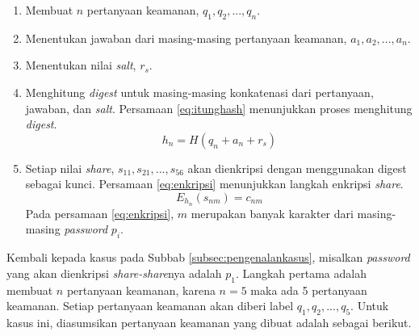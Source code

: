 \begin{enumerate}
	\item Membuat \begin{math}n\end{math} pertanyaan keamanan, \begin{math}q_1, q_2, ..., q_n\end{math}.
	\item Menentukan jawaban dari masing-masing pertanyaan keamanan, \begin{math}a_1, a_2, ..., a_n\end{math}.
	\item Menentukan nilai \textit{salt}, \begin{math}r_s\end{math}.
	\item Menghitung \textit{digest} untuk masing-masing konkatenasi dari pertanyaan, jawaban, dan \textit{salt}. Persamaan \ref{eq:itunghash} menunjukkan proses menghitung \textit{digest}.
	\begin{equation}
		h_n = H(q_n + a_n + r_s) \label{eq:itunghash}
	\end{equation}
	\item Setiap nilai \textit{share}, \begin{math}s_{11}, s_{21}, ..., s_{56}\end{math} akan dienkripsi dengan menggunakan digest sebagai kunci. Persamaan \ref{eq:enkripsi} menunjukkan langkah enkripsi \textit{share}.
	\begin{equation}
		E_{h_n}(s_{nm}) = c_{nm}
	\end{equation}
	Pada persamaan \ref{eq:enkripsi}, \begin{math}m\end{math} merupakan banyak karakter dari masing-masing \textit{password} \begin{math}p_i\end{math}.
\end{enumerate}

Kembali kepada kasus pada Subbab \ref{subsec:pengenalankasus}, misalkan \textit{password} yang akan dienkripsi \textit{share-share}nya adalah \begin{math}p_1\end{math}. Langkah pertama adalah membuat \begin{math}n\end{math} pertanyaan keamanan, karena \begin{math}n=5\end{math} maka ada 5 pertanyaan keamanan. Setiap pertanyaan keamanan akan diberi label \begin{math}q_1, q_2, ..., q_5\end{math}. Untuk kasus ini, diasumsikan pertanyaan keamanan yang dibuat adalah sebagai berikut.

